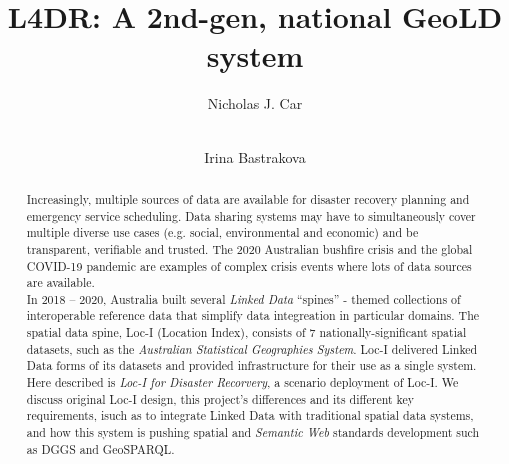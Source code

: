 \documentclass[runningheads]{llncs}
\begin{document}
\title{L4DR: A 2nd-gen, national GeoLD system}

\author{
    Nicholas J. Car \and \\
    Irina Bastrakova
}



\maketitle

\begin{abstract}
Increasingly, multiple sources of data are available for disaster recovery planning and emergency service scheduling. Data sharing systems may
have to simultaneously cover multiple diverse use cases (e.g. social, environmental and economic) and be transparent, verifiable and trusted. 
The 2020 Australian bushfire crisis and the global COVID-19 pandemic are examples of complex crisis events where lots of data sources are available.\\

In 2018 – 2020, Australia built several \textit{Linked Data} ``spines'' - themed collections of interoperable reference data that simplify data 
integreation in particular domains. 
The spatial data spine, Loc-I (Location Index), consists of 7 nationally-significant spatial datasets, such as the \textit{Australian Statistical Geographies System}. 
Loc-I delivered Linked Data forms of its datasets and provided infrastructure for their use as a single system.\\

Here described is \textit{Loc-I for Disaster Recorvery}, a scenario deployment of Loc-I.
We discuss original Loc-I design, this project's differences and its different key requirements, isuch as to integrate Linked Data with traditional
spatial data systems, and how this system is pushing spatial and \textit{Semantic Web} standards development such as DGGS and GeoSPARQL.

\end{abstract}
\end{document}
